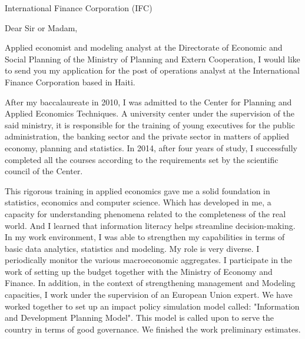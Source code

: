 \documentclass[12pt]{lettre}
\date{11 August, 2020}%
\begin{document}
\begin{letter}{
International Finance Corporation (IFC)
}
\address{
 Alexandro Disla\\
25, carefour Ism\'{e}, impasse F\'{e}n\'{e}lon\\
Pernier 23} 
\nofax{}
\signature{}

 
\opening{Dear Sir or Madam,}

\begin{spacing}{1.5}

Applied economist and modeling analyst 
at the Directorate of Economic and Social Planning 
of the Ministry of Planning and Extern 
Cooperation, I would like to send you my 
application for the post of operations analyst 
at the International Finance Corporation based in Haiti.

After my baccalaureate in 2010, I was admitted to the Center for Planning and 
Applied Economics Techniques. A university 
center under the supervision of the said ministry, it is 
responsible for the training of young executives for the 
public administration, the banking sector and the private 
sector in matters of applied economy, planning and statistics. 
In 2014, after four years of study, I successfully completed 
all the courses according to the requirements set by the 
scientific council of the Center.

This rigorous training in applied economics gave me a solid 
foundation in statistics, economics and computer science. 
Which has developed in me, a capacity for understanding 
phenomena related to the completeness of the real world. 
And I learned that information literacy helps streamline 
decision-making. In my work environment, I was able to 
strengthen my capabilities in terms of basic data analytics, 
statistics  and modeling. My role is very diverse. I 
periodically monitor the various macroeconomic aggregates. 
I participate in the work of setting up the budget 
together with the Ministry of Economy and Finance. 
In addition, in the context of strengthening management 
and Modeling capacities, I work under the 
supervision of an European Union expert. We have worked together 
to set up an impact policy simulation model 
called: "Information and Development Planning Model". 
This model is called upon to serve the country in terms of 
good governance. We finished the work preliminary estimates.


\end{spacing}
\end{letter}
\end{document}
